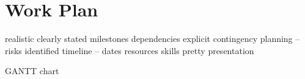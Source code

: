 \chapter{Work Plan}
\label{chap:plan}

realistic
clearly stated milestones
dependencies explicit
contingency planning – risks identified
timeline – dates
resources
skills
pretty presentation

GANTT chart